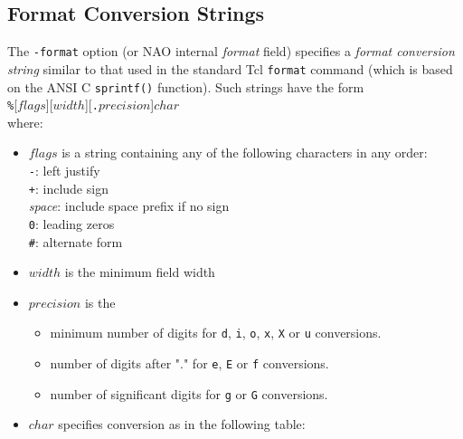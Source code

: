   \subsection{
    \label{format-strings}Format Conversion Strings
  }

  

The 
  \texttt{-format} option (or NAO internal 
  \emph{format} field) specifies a 
  \emph{format conversion string} similar to that used in the standard
  Tcl 
  \texttt{format} command (which is based on the ANSI C 
  \texttt{sprintf()} function). Such strings have the form
  \\
  \texttt{\%}[$flags$][$width$][\texttt{.}$precision$]$char$
  \\where:
  \begin{itemize}
    \item 
    $flags$ is a string containing any of the following
    characters in any order:
    \\
    \texttt{-}: left justify
    \\
    \texttt{+}: include sign
    \\
    \emph{space}: include space prefix if no sign
    \\
    \texttt{0}: leading zeros
    \\
    \texttt{\#}: alternate form
    \item 
    $width$ is the minimum field width
    \item 
    $precision$ is the
    \begin{itemize}
      \item minimum number of digits for 
      \texttt{d}, 
      \texttt{i}, 
      \texttt{o}, 
      \texttt{x}, 
      \texttt{X} or 
      \texttt{u} conversions.
      \item number of digits after "." for 
      \texttt{e}, 
      \texttt{E} or 
      \texttt{f} conversions.
      \item number of significant digits for 
      \texttt{g} or 
      \texttt{G} conversions.
    \end{itemize}
    \item 
    $char$ specifies conversion as in the following table:


\end{itemize}
